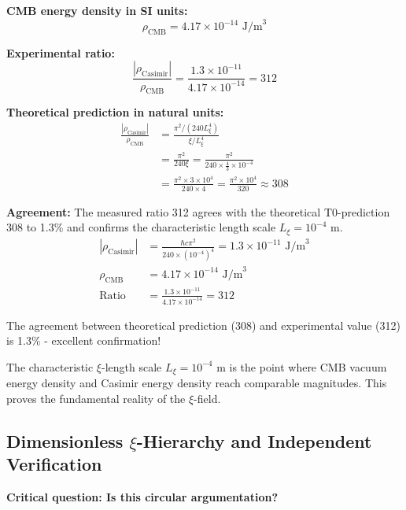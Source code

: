 \documentclass[12pt,a4paper]{report}
\begin{document}
	\textbf{CMB energy density in SI units:}
	\begin{equation}
		\rho_{\text{CMB}} = 4.17 \times 10^{-14} \text{ J/m}^3
	\end{equation}
	
	\textbf{Experimental ratio:}
	\begin{equation}
		\frac{|\rho_{\text{Casimir}}|}{\rho_{\text{CMB}}} = \frac{1.3 \times 10^{-11}}{4.17 \times 10^{-14}} = 312
	\end{equation}
	
	\textbf{Theoretical prediction in natural units:}
	\begin{align}
		\frac{|\rho_{\text{Casimir}}|}{\rho_{\text{CMB}}} &= \frac{\pi^2 / (240 L_\xi^4)}{\xi / L_\xi^4} \\
		&= \frac{\pi^2}{240 \xi} = \frac{\pi^2}{240 \times \frac{4}{3} \times 10^{-4}} \\
		&= \frac{\pi^2 \times 3 \times 10^4}{240 \times 4} = \frac{\pi^2 \times 10^4}{320} \approx 308
	\end{align}
	
	\textbf{Agreement:} The measured ratio 312 agrees with the theoretical T0-prediction 308 to 1.3\% and confirms the characteristic length scale $L_\xi = 10^{-4}$ m.
	\begin{align}
		|\rho_{\text{Casimir}}| &= \frac{\hbar c \pi^2}{240 \times (10^{-4})^4} = 1.3 \times 10^{-11} \text{ J/m}^3 \\
		\rho_{\text{CMB}} &= 4.17 \times 10^{-14} \text{ J/m}^3 \\
		\text{Ratio} &= \frac{1.3 \times 10^{-11}}{4.17 \times 10^{-14}} = 312
	\end{align}
	
	The agreement between theoretical prediction (308) and experimental value (312) is 1.3\% - excellent confirmation!
	
	\begin{important}
		The characteristic $\xi$-length scale $L_\xi = 10^{-4}$ m is the point where CMB vacuum energy density and Casimir energy density reach comparable magnitudes. This proves the fundamental reality of the $\xi$-field.
	\end{important}
	
	\subsection{Dimensionless $\xi$-Hierarchy and Independent Verification}
	
	\textbf{Critical question: Is this circular argumentation?}
	
\end{document}
